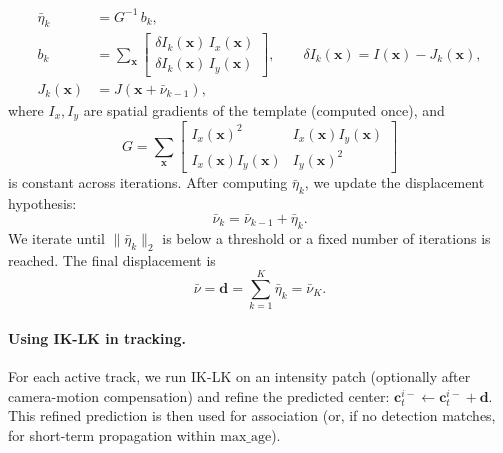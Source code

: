\begin{align}
\bar{\eta}_k &= G^{-1}\,b_k,\\
b_k &= \sum_{\mathbf{x}}\begin{bmatrix}
\delta I_k(\mathbf{x})\,I_x(\mathbf{x})\\
\delta I_k(\mathbf{x})\,I_y(\mathbf{x})
\end{bmatrix},\qquad
\delta I_k(\mathbf{x}) = I(\mathbf{x}) - J_k(\mathbf{x}),\\
J_k(\mathbf{x}) &= J(\mathbf{x}+\bar{\nu}_{k-1}),
\end{align}
where $I_x,I_y$ are spatial gradients of the template (computed once), and
\begin{equation}
G=\sum_{\mathbf{x}}
\begin{bmatrix}
I_x(\mathbf{x})^2 & I_x(\mathbf{x})I_y(\mathbf{x})\\
I_x(\mathbf{x})I_y(\mathbf{x}) & I_y(\mathbf{x})^2
\end{bmatrix}
\end{equation}
is constant across iterations. After computing $\bar{\eta}_k$, we update the displacement hypothesis:
\begin{equation}
\bar{\nu}_k=\bar{\nu}_{k-1}+\bar{\eta}_k.
\end{equation}
We iterate until $\|\bar{\eta}_k\|_2$ is below a threshold or a fixed number of iterations is reached. The final displacement is
\begin{equation}
\bar{\nu}=\mathbf{d}=\sum_{k=1}^{K}\bar{\eta}_k=\bar{\nu}_K.
\end{equation}

\paragraph{Using IK-LK in tracking.}
For each active track, we run IK-LK on an intensity patch (optionally after camera-motion compensation) and refine the predicted center:
$\mathbf{c}^{i-}_t \leftarrow \mathbf{c}^{i-}_t + \mathbf{d}$.
This refined prediction is then used for association (or, if no detection matches, for short-term propagation within $\text{max\_age}$).